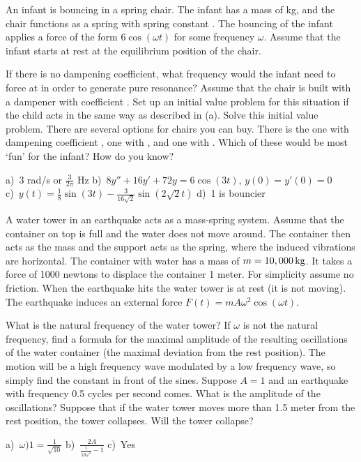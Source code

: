 \begin{exercise}
An infant is bouncing in a spring chair. The infant has a mass of \unit[8]{kg}, and the chair functions as a spring with spring constant . The bouncing of the infant applies a force of the form $6 \cos(\omega t)$ for some frequency $\omega$. Assume that the infant starts at rest at the equilibrium position of the chair.
\begin{tasks}
\task If there is no dampening coefficient, what frequency would the infant need to force at in order to generate pure resonance?
\task Assume that the chair is built with a dampener with coefficient . Set up an initial value problem for this situation if the child acts in the same way as described in (a).
\task Solve this initial value problem.
\task There are several options for chairs you can buy. There is the one with dampening coefficient , one with , and one with . Which of these would be most `fun' for the infant? How do you know?
\end{tasks}
\end{exercise}
\comboSol{%
}
{%
a)~$3$ rad/s or $\frac{3}{2\pi}$ Hz \quad b)~$8y'' + 16y' + 72y = 6\cos(3t)$, $y(0) = y'(0) = 0$ \\
c)~$y(t) = \frac{1}{8}\sin(3t) - \frac{3}{16\sqrt{2}}\sin(2\sqrt{2} t)$ \quad d)~1 is bouncier
}

\begin{exercise}
\pagebreak[3]
A water tower in an earthquake acts as a mass-spring system.
Assume that the container on top is full and the water does not move around.
The container then acts as the mass and the support acts as the spring, where
the induced vibrations are horizontal.  The container with water
has a mass of $m=\unit[10,000]{kg}$.  It takes a force of 1000 newtons
to displace the container 1 meter.  For simplicity assume no friction.
When the earthquake hits the water tower is at rest (it is not moving).
%
The earthquake induces an external force 
$F(t) = m A \omega^2 \cos (\omega t)$.
\begin{tasks}
\task
What is the natural frequency of the water tower?
\task
If $\omega$ is not the natural frequency, find a formula for the maximal
amplitude of the resulting oscillations of the water container (the maximal
deviation from the rest position).  The motion will be a high frequency wave
modulated by a low frequency wave, so simply find the constant in front of the
sines.
\task
Suppose $A = 1$ and an earthquake with frequency 0.5 cycles per second
comes.  What is the amplitude of the oscillations?  Suppose that if the water
tower moves more than 1.5 meter from the rest position, the tower collapses.
Will the tower collapse?
\end{tasks}
\end{exercise}
\comboSol{%
}
{%
a)~$\omega)1 = \frac{1}{\sqrt{10}}$ \quad b)~$\frac{2A}{\frac{1}{10\omega^2} - 1}$ \quad c)~Yes
}

